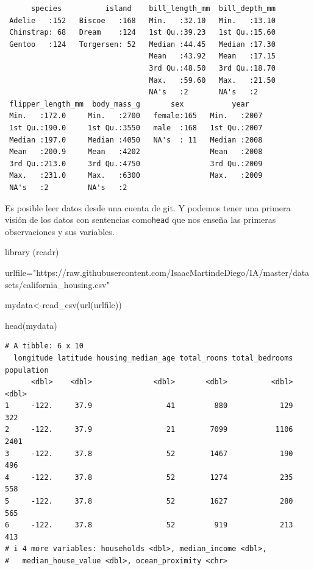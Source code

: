 \documentclass[
  letterpaper,
  DIV=11,
  numbers=noendperiod]{scrreprt}
\newenvironment{Shaded}{\begin{snugshade}}{\end{snugshade}}
\newcommand{\FunctionTok}[1]{\textcolor[rgb]{0.28,0.35,0.67}{#1}}
\newcommand{\NormalTok}[1]{\textcolor[rgb]{0.00,0.23,0.31}{#1}}
\newcommand{\OtherTok}[1]{\textcolor[rgb]{0.00,0.23,0.31}{#1}}
\newcommand{\StringTok}[1]{\textcolor[rgb]{0.13,0.47,0.30}{#1}}
\begin{document}
\begin{verbatim}
      species          island    bill_length_mm  bill_depth_mm  
 Adelie   :152   Biscoe   :168   Min.   :32.10   Min.   :13.10  
 Chinstrap: 68   Dream    :124   1st Qu.:39.23   1st Qu.:15.60  
 Gentoo   :124   Torgersen: 52   Median :44.45   Median :17.30  
                                 Mean   :43.92   Mean   :17.15  
                                 3rd Qu.:48.50   3rd Qu.:18.70  
                                 Max.   :59.60   Max.   :21.50  
                                 NA's   :2       NA's   :2      
 flipper_length_mm  body_mass_g       sex           year     
 Min.   :172.0     Min.   :2700   female:165   Min.   :2007  
 1st Qu.:190.0     1st Qu.:3550   male  :168   1st Qu.:2007  
 Median :197.0     Median :4050   NA's  : 11   Median :2008  
 Mean   :200.9     Mean   :4202                Mean   :2008  
 3rd Qu.:213.0     3rd Qu.:4750                3rd Qu.:2009  
 Max.   :231.0     Max.   :6300                Max.   :2009  
 NA's   :2         NA's   :2                                 
\end{verbatim}

Es posible leer datos desde una cuenta de git. Y podemos tener una
primera visión de los datos con sentencias como\texttt{head} que nos
enseña las primeras observaciones y sus variables.

\begin{Shaded}
\begin{Highlighting}[]
\FunctionTok{library}\NormalTok{ (readr)}

\NormalTok{urlfile}\OtherTok{=}\StringTok{"https://raw.githubusercontent.com/IsaacMartindeDiego/IA/master/datasets/california\_housing.csv"}

\NormalTok{mydata}\OtherTok{\textless{}{-}}\FunctionTok{read\_csv}\NormalTok{(}\FunctionTok{url}\NormalTok{(urlfile))}

\FunctionTok{head}\NormalTok{(mydata)}
\end{Highlighting}
\end{Shaded}

\begin{verbatim}
# A tibble: 6 x 10
  longitude latitude housing_median_age total_rooms total_bedrooms population
      <dbl>    <dbl>              <dbl>       <dbl>          <dbl>      <dbl>
1     -122.     37.9                 41         880            129        322
2     -122.     37.9                 21        7099           1106       2401
3     -122.     37.8                 52        1467            190        496
4     -122.     37.8                 52        1274            235        558
5     -122.     37.8                 52        1627            280        565
6     -122.     37.8                 52         919            213        413
# i 4 more variables: households <dbl>, median_income <dbl>,
#   median_house_value <dbl>, ocean_proximity <chr>
\end{verbatim}
\end{document}
